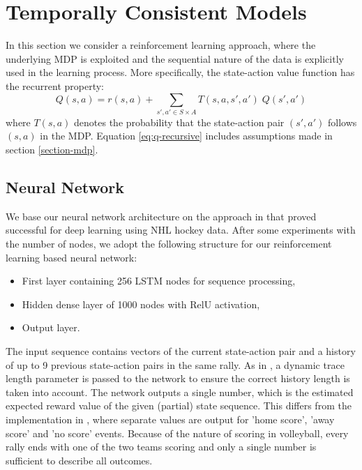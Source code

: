 \documentclass{sfuthesis}
\begin{document}
	\section{Temporally Consistent Models}
	
	In this section we consider a reinforcement learning approach, where the underlying MDP is exploited and the sequential nature of the data is explicitly used in the learning process. More specifically, the state-action value function has the recurrent property:
	\begin{equation}
		Q(s,a) = r(s,a) +\sum_{s',a' \in S \times A} T(s,a,s',a') \; Q(s', a')
		\label{eq:q-recursive}
	\end{equation}
	where $T(s,a)$ denotes the probability that the state-action pair $(s',a')$ follows $(s,a)$ in the MDP. Equation \eqref{eq:q-recursive} includes assumptions made in section \ref{section-mdp}.
	
	\subsection{Neural Network}
	
	We base our neural network architecture on the approach in \cite{liu2018deep} that proved successful for deep learning using NHL hockey data. After some experiments with the number of nodes, we adopt the following structure for our reinforcement learning based neural network:
	\begin{itemize}
		\item First layer containing 256 LSTM nodes for sequence processing,
		\item Hidden dense layer of 1000 nodes with RelU activation,
		\item Output layer.
	\end{itemize}
	The input sequence contains vectors of the current state-action pair and a history of up to 9 previous state-action pairs in the same rally. As in \cite{liu2018deep}, a dynamic trace length parameter is passed to the network to ensure the correct history length is taken into account. The network outputs a single number, which is the estimated expected reward value of the given (partial) state sequence. This differs from the implementation in \cite{liu2018deep}, where separate values are output for 'home score', 'away score' and 'no score' events. Because of the nature of scoring in volleyball, every rally ends with one of the two teams scoring and only a single number is sufficient to describe all outcomes.
	
\end{document}
